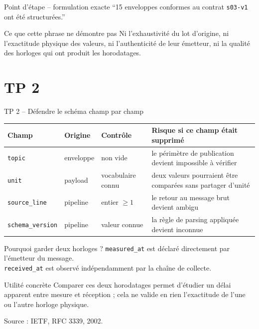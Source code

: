 \documentclass[aspectratio=169]{beamer}
\newcommand{\sourcefoot}[1]{\vfill\tiny\color{gray}Source : #1}
\begin{document}
\begin{frame}{Point d'étape -- formulation exacte}
``15 enveloppes conformes au contrat \texttt{s03-v1} ont été structurées.''
\begin{alertblock}{Ce que cette phrase ne démontre pas}
Ni l'exhaustivité du lot d'origine, ni l'exactitude physique des valeurs, ni l'authenticité de leur émetteur, ni la qualité des horloges qui ont produit les horodatages.
\end{alertblock}
\end{frame}

\section{TP 2}
\begin{frame}{TP 2 -- Défendre le schéma champ par champ}
\scriptsize
\begin{tabular}{@{}p{}p{}p{}p{}@{}}
\toprule
Champ & Origine & Contrôle & Risque si ce champ était supprimé \\
\midrule
\texttt{topic} & enveloppe & non vide & le périmètre de publication devient impossible à vérifier \\[2pt]
\texttt{unit} & payload & vocabulaire connu & deux valeurs pourraient être comparées sans partager d'unité \\[2pt]
\texttt{source\_line} & pipeline & entier $\geq 1$ & le retour au message brut devient ambigu \\[2pt]
\texttt{schema\_version} & pipeline & valeur connue & la règle de parsing appliquée devient inconnue \\
\bottomrule
\end{tabular}
\end{frame}

\begin{frame}{Pourquoi garder deux horloges ?}
\texttt{measured\_at} est déclaré directement par l'émetteur du message.\\
\texttt{received\_at} est observé indépendamment par la chaîne de collecte.
\begin{block}{Utilité concrète}
Comparer ces deux horodatages permet d'étudier un délai apparent entre mesure et réception ; cela ne valide en rien l'exactitude de l'une ou l'autre horloge physique.
\end{block}
\sourcefoot{IETF, RFC 3339, 2002.}
\end{frame}
\end{document}
